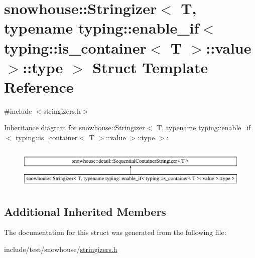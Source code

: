 \hypertarget{structsnowhouse_1_1Stringizer_3_01T_00_01typename_01typing_1_1enable__if_3_01typing_1_1is__contacfdff2199417d834dd78a5716bd32df6}{}\section{snowhouse\+::Stringizer$<$ T, typename typing\+::enable\+\_\+if$<$ typing\+::is\+\_\+container$<$ T $>$\+::value $>$\+::type $>$ Struct Template Reference}
\label{structsnowhouse_1_1Stringizer_3_01T_00_01typename_01typing_1_1enable__if_3_01typing_1_1is__contacfdff2199417d834dd78a5716bd32df6}


{\ttfamily \#include $<$stringizers.\+h$>$}

Inheritance diagram for snowhouse\+::Stringizer$<$ T, typename typing\+::enable\+\_\+if$<$ typing\+::is\+\_\+container$<$ T $>$\+::value $>$\+::type $>$\+:\begin{figure}[H]
\begin{center}
\leavevmode
\includegraphics[height=1.982301cm]{structsnowhouse_1_1Stringizer_3_01T_00_01typename_01typing_1_1enable__if_3_01typing_1_1is__contacfdff2199417d834dd78a5716bd32df6}
\end{center}
\end{figure}
\subsection*{Additional Inherited Members}


The documentation for this struct was generated from the following file\+:\begin{DoxyCompactItemize}
\item 
include/test/snowhouse/\mbox{\hyperlink{stringizers_8h}{stringizers.\+h}}\end{DoxyCompactItemize}
